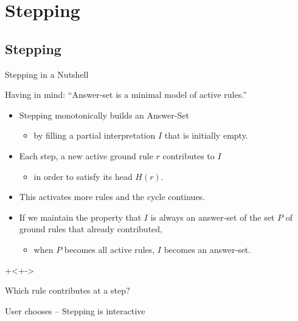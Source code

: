 \documentclass{beamer}
\begin{document}
\section{Stepping}


\subsection{Stepping}

\begin{frame}{Stepping in a Nutshell}
	\onslide<+->
	
	Having in mind: ``Answer-set is a minimal model of active rules.''
	
	\onslide<+->
	\begin{itemize}
		\item Stepping monotonically builds an Answer-Set
		\onslide<+->
		\begin{itemize}
			\item by filling a partial interpretation $I$ that is initially empty.
		\end{itemize}
		\onslide<+->
		\item Each step, a new active ground rule $r$ contributes to $I$
		\onslide<+->
		\begin{itemize}
			\item in order to satisfy its head $H(r)$.
		\end{itemize}
		\onslide<+->
		\item This activates more rules and the cycle continues.
		\onslide<+->
		\item If we maintain the property that $I$ is always an answer-set of
		the set $P$ of ground rules that already contributed,
		\onslide<+->
		\begin{itemize}
			\item when $P$ becomes all active rules, $I$ becomes an answer-set.
		\end{itemize}
	\end{itemize}
	
	\onslide+<+->{\vspace{10pt}

		Which rule contributes at a step?

		\onslide<+->
		User chooses -- Stepping is interactive
	}
	
\end{frame}
\end{document}
